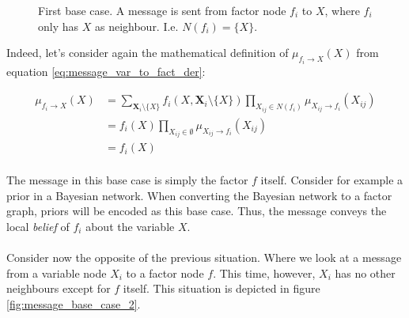 \begin{figure}[h!]
\centering
{}
\caption{First base case. A message is sent from factor node $f_i$
to $X$, where $f_i$ only has $X$ as neighbour. I.e. $N(f_i) = \{X\}$.}
\label{fig:message_base_case_1}
\end{figure}

\noindent
Indeed, let's consider again the mathematical definition 
of $\mu_{f_i \rightarrow X}(X)$ from equation \ref{eq:message_var_to_fact_der}:

\begin{equation}\begin{split}
\mu_{f_i \rightarrow X}(X) 
	&=\sum_{\textbf{X}_i\setminus \{X\}} f_i(X, \textbf{X}_i \setminus \{X\}) 
	\prod_{X_{ij} \in N(f_i)} \mu_{X_{ij} \rightarrow f_i}(X_{ij})\\
	&= f_i(X)\prod_{X_{ij} \in \emptyset}\mu_{X_{ij} \rightarrow f_i}(X_{ij})\\
	&= f_i(X)\\
\end{split}\end{equation}

\noindent
The message in this base case is simply the factor $f$ itself. Consider 
for example a prior in a Bayesian network. When converting the Bayesian
network to a factor graph, priors will be encoded as this base case.
Thus, the message conveys the local \textit{belief} of $f_i$ about
the variable $X$.
\\\\
Consider now the opposite of the previous situation. Where we
look at a message from a variable node $X_i$ to a factor node 
$f$. This time, however, $X_i$ has no other neighbours except for
$f$ itself. This situation is depicted in figure 
\ref{fig:message_base_case_2}.

